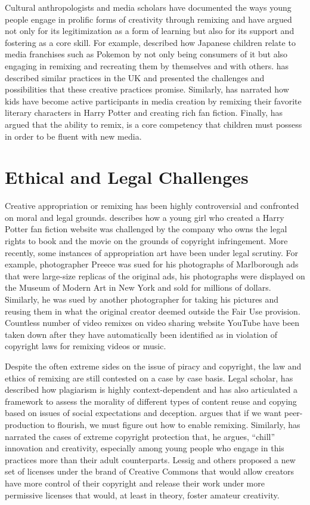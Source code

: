 Cultural anthropologists and media scholars have documented the ways young people engage in prolific forms of creativity through remixing and have argued not only for its legitimization as a form of learning but also for its support and fostering as a core skill.
For example, \citet{ito_yugi} described how Japanese children relate to media franchises such as Pokemon by not only being consumers of it but also engaging in remixing and recreating them by themselves and with others.
\citet{livingstone_taking_2008} has described similar practices in the UK and presented the challenges and possibilities that these creative practices promise.
Similarly, \citet{jenkins_convergence_2006} has narrated how kids have become active participants in media creation by remixing their favorite literary characters in Harry Potter and creating rich fan fiction.
Finally, \citet{jenkins_confronting_2009} has argued that the ability to remix, is a core competency that children must possess in order to be fluent with new media.

\section{Ethical and Legal Challenges}
Creative appropriation or remixing has been highly controversial and confronted on moral and legal grounds. 
\citet{jenkins_convergence_2006} describes how a young girl who created a Harry Potter fan fiction website was challenged by the company who owns the legal rights to book and the movie on the grounds of copyright infringement. 
More recently, some instances of appropriation art have been under legal scrutiny. For example, photographer Preece was sued for his photographs of Marlborough ads that were large-size replicas of the original ads, his photographs were displayed on the Museum of Modern Art in New York and sold for millions of dollars.
Similarly, he was sued by another photographer for taking his pictures and reusing them in what the original creator deemed outside the Fair Use provision.
Countless number of video remixes on video sharing website YouTube have been taken down after they have automatically been identified as in violation of copyright laws for remixing videos or music. 

Despite the often extreme sides on the issue of piracy and copyright, the law and ethics of remixing are still contested on a case by case basis. Legal scholar, \citet{posner_little_2007} has described how plagiarism is highly context-dependent and has also articulated a framework to assess the morality of different types of content reuse and copying based on issues of social expectations and deception. 
\citet{benkler_wealth_2006} argues that if we want peer-production to flourish, we must figure out how to enable remixing. Similarly, 
\citet{lessig_remix:2008} has narrated the cases of extreme copyright protection that, he argues, ``chill''
 innovation and creativity, especially among young people who engage in this practices more than their adult counterparts. Lessig and others proposed a new set of licenses under the brand of Creative Commons that would allow creators have more control of their copyright and release their work under more permissive licenses that would, at least in theory, foster amateur creativity.

